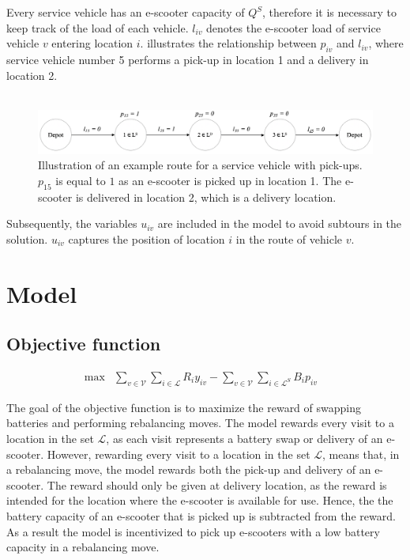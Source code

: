 Every service vehicle has an e-scooter capacity of $Q^{S}$, therefore it is necessary to keep track of the load of each vehicle. $l_{iv}$ denotes the e-scooter load of service vehicle $v$ entering location $i$.  illustrates the relationship between $p_{iv}$ and $l_{iv}$, where service vehicle number 5 performs a pick-up in location 1 and a delivery in location 2. 
\\\
\begin{figure}[h]
    \centering
    \includegraphics[width=15cm]{Images/l_p_illustration.png}
    \caption[Illustration of an example route for a service vehicle with pick-ups]{Illustration of an example route for a service vehicle with pick-ups. $p_{15}$ is equal to $1$ as an e-scooter is picked up in location 1. The e-scooter is delivered in location 2, which is a delivery location.}
    \label{fig:l_p__illustration}
\end{figure}

Subsequently, the variables $u_{iv}$ are included in the model to avoid subtours in the solution. $u_{iv}$ captures the position of location $i$ in the route of vehicle $v$.

\section{Model}\label{model}

\subsection{Objective function}
\begin{eqnarray}
     \max & \displaystyle\sum_{v\in \mathcal{V}} \displaystyle\sum_{i \in \mathcal{L}} R_{i}y_{iv} - \displaystyle\sum_{v\in \mathcal{V}} \displaystyle\sum_{i \in \mathcal{L}^{S}} B_{i}p_{iv} & \label{eq:objective_5}
\end{eqnarray}

The goal of the objective function is to maximize the reward of swapping batteries and performing rebalancing moves. The model rewards every visit to a location in the set $\mathcal{L}$, as each visit represents a battery swap or delivery of an e-scooter. However, rewarding every visit to a location in the set $\mathcal{L}$, means that, in a rebalancing move, the model rewards both the pick-up and delivery of an e-scooter. The reward should only be given at delivery location, as the reward is intended for the location where the e-scooter is available for use. Hence, the the battery capacity of an e-scooter that is picked up is subtracted from the reward. As a result the model is incentivized to pick up e-scooters with a low battery capacity in a rebalancing move. 

